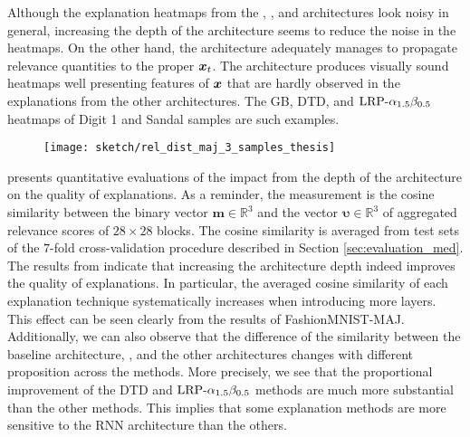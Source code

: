 Although the explanation heatmaps from the , , and  architectures look noisy in general, increasing the depth of the architecture seems to reduce the noise in the heatmaps.   On the other hand, the  architecture adequately manages to propagate relevance quantities to the proper $\boldsymbol{x}_t$. The architecture produces visually sound heatmaps well presenting features of $\boldsymbol{x}$ that are hardly observed in the explanations from the other architectures.  The GB, DTD, and $\text{LRP-}\alpha_{1.5}\beta_{0.5}$ heatmaps of Digit 1 and Sandal samples are such examples.

 \begin{figure}[!hbt]
\centering
\texttt{[image: sketch/rel\_dist\_maj\_3\_samples\_thesis]}



\label{fig:rel_dist_maj_3_samples_thesis}
\end{figure}

\addfigure{\ref{fig:rel_dist_maj_3_samples_thesis}} presents quantitative evaluations of the impact from the depth of the architecture on the quality of explanations. As a reminder, the measurement is the cosine similarity between the binary vector $\boldsymbol{m} \in \mathbb{R}^3$ and the vector $\boldsymbol{\upsilon} \in \mathbb{R}^3$ of aggregated relevance scores of $28\times28$ blocks. The cosine similarity is averaged from test sets of the $7$-fold cross-validation procedure described in Section \ref{sec:evaluation_med}. The results from \addfigure{\ref{fig:rel_dist_maj_3_samples_thesis}} indicate that increasing the architecture depth indeed improves the quality of explanations. In particular, the averaged cosine similarity of each explanation technique systematically increases when introducing  more layers. This effect can be seen clearly from the results of FashionMNIST-MAJ. Additionally, we can also observe that the difference of the similarity between the baseline architecture, , and the other  architectures changes with different proposition across the methods. More precisely, we see that the proportional improvement of  the DTD and $\text{LRP-}\alpha_{1.5}\beta_{0.5}$ methods are much more substantial than the other methods. This implies that some explanation methods are more sensitive to the RNN architecture than the others.



